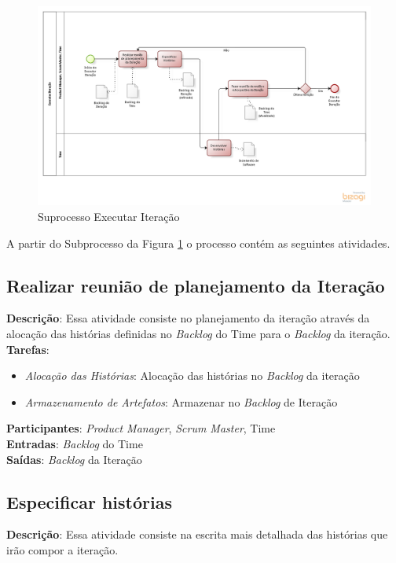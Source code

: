 \begin{figure}[!htb]
\includegraphics[scale=0.5]{figuras/iteracao.png}
\caption{Suprocesso Executar Iteração}
\label{fig:iteracao}
\end{figure}

A partir do Subprocesso da Figura \ref{fig:iteracao} o processo contém as seguintes atividades.

\subsection{Realizar reunião de planejamento da Iteração}
  \textbf{Descrição}: Essa atividade consiste no planejamento da iteração através da alocação das histórias definidas no \textit{Backlog} do Time para o \textit{Backlog} da iteração. \\

  \textbf{Tarefas}:
  \begin{itemize}
   \item \indent \textit{Alocação das Histórias}: Alocação das histórias no \textit{Backlog} da iteração

   \item \indent \textit{Armazenamento de Artefatos}: Armazenar no \textit{Backlog} de Iteração
  \end{itemize}

  \textbf{Participantes}: \textit{Product Manager}, \textit{Scrum Master}, Time\\

  \textbf{Entradas}: \textit{Backlog} do Time \\

  \textbf{Saídas}:  \textit{Backlog} da Iteração\\

\subsection{Especificar histórias}
  \textbf{Descrição}: Essa atividade consiste na escrita mais detalhada das histórias que irão compor a
iteração. \\

